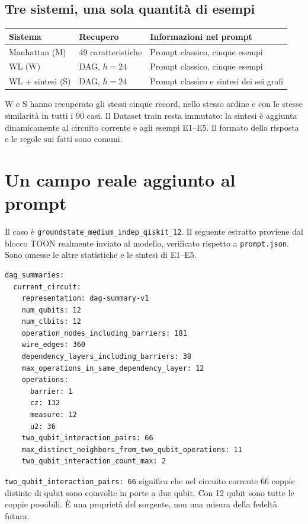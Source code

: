 \documentclass[a4paper,10pt]{article}
\begin{document}
\subsection{Tre sistemi, una sola quantità di esempi}
\par\medskip\begingroup\small\renewcommand{\arraystretch}{1.18}\setlength{\tabcolsep}{5pt}
\begin{tabularx}{\linewidth}{l l X}\toprule
Sistema & Recupero & Informazioni nel prompt\\\midrule
Manhattan (M) & 49 caratteristiche & Prompt classico, cinque esempi\\
WL (W) & DAG, $h=24$ & Prompt classico, cinque esempi\\
WL + sintesi (S) & DAG, $h=24$ & Prompt classico e sintesi dei sei grafi\\
\bottomrule\end{tabularx}\endgroup\par
W e S hanno recuperato gli stessi cinque record, nello stesso ordine e
con le stesse similarità in tutti i 90 casi. Il Dataset train resta immutato:
la sintesi è aggiunta dinamicamente al circuito corrente e agli esempi E1--E5.
Il formato della risposta e le regole sui fatti sono comuni.
\clearpage\section{Un campo reale aggiunto al prompt}
Il caso è \nolinkurl{groundstate_medium_indep_qiskit_12}. Il seguente estratto proviene dal blocco TOON realmente inviato al modello, verificato rispetto a \texttt{prompt.json}. Sono omesse le altre statistiche e le sintesi di E1--E5.\par\begin{Verbatim}[fontsize=\small,frame=single]
dag_summaries:
  current_circuit:
    representation: dag-summary-v1
    num_qubits: 12
    num_clbits: 12
    operation_nodes_including_barriers: 181
    wire_edges: 360
    dependency_layers_including_barriers: 38
    max_operations_in_same_dependency_layer: 12
    operations:
      barrier: 1
      cz: 132
      measure: 12
      u2: 36
    two_qubit_interaction_pairs: 66
    max_distinct_neighbors_from_two_qubit_operations: 11
    two_qubit_interaction_count_max: 2
\end{Verbatim}
\texttt{two\_qubit\_interaction\_pairs: 66} significa che nel circuito
corrente 66 coppie distinte di qubit sono coinvolte in porte a due qubit.
Con 12 qubit sono tutte le coppie possibili. È una proprietà del sorgente,
non una misura della fedeltà futura.
\end{document}
